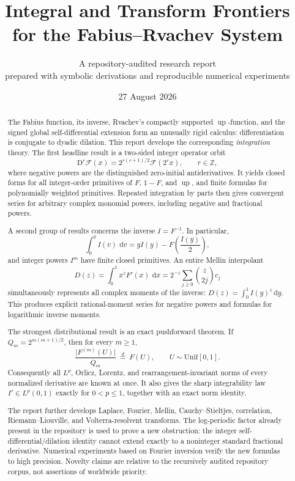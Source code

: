 \documentclass[11pt]{article}
\title{\bfseries Integral and Transform Frontiers\\[2mm]
for the Fabius--Rvachev System}
\author{A repository-audited research report\\
\small prepared with symbolic derivations and reproducible numerical experiments}
\date{27 August 2026}
\theoremstyle{definition}
\theoremstyle{remark}
\DeclareMathOperator{\upf}{up}
\newcommand{\dd}{\,\mathrm d}
\newcommand{\FF}{\mathscr F}
\newcommand{\abs}[1]{\lvert#1\rvert}
\begin{document}
\maketitle

\begin{abstract}
The Fabius function, its inverse, Rvachev's compactly supported \(\upf\)-function,
and the signed global self-differential extension form an unusually rigid calculus:
differentiation is conjugate to dyadic dilation.  This report develops the corresponding
\emph{integration} theory.  The first headline result is a two-sided integer
operator orbit
\[
  \mathrm D^r\FF(x)=2^{r(r+1)/2}\FF(2^r x),\qquad r\in\mathbb Z,
\]
where negative powers are the distinguished zero-initial antiderivatives.  It yields
closed forms for all integer-order primitives of \(F\), \(1-F\), and \(\upf\), and
finite formulas for polynomially weighted primitives.  Repeated integration by parts
then gives convergent series for arbitrary complex monomial powers, including negative
and fractional powers.

A second group of results concerns the inverse \(I=F^{-1}\).  In particular,
\[
  \int_0^y I(v)\,\dd v
  =yI(y)-F\!\left(\frac{I(y)}2\right),
\]
and integer powers \(I^m\) have finite closed primitives.  An entire Mellin
interpolant
\[
  D(z)=\int_0^1 x^zF'(x)\,\dd x
      =2^{-z}\sum_{j\ge0}\binom z{2j}c_j
\]
simultaneously represents all complex moments of the inverse:
\(D(z)=\int_0^1I(y)^z\dd y\).  This produces explicit rational-moment series for
negative powers and formulas for logarithmic inverse moments.

The strongest distributional result is an exact pushforward theorem.  If
\(Q_m=2^{m(m+1)/2}\), then for every \(m\ge1\),
\[
  \frac{\abs{F^{(m)}(U)}}{Q_m}\ \stackrel{d}{=}\ F(U),\qquad U\sim\mathrm{Unif}[0,1].
\]
Consequently all \(L^p\), Orlicz, Lorentz, and rearrangement-invariant norms of every
normalized derivative are known at once.  It also gives the sharp integrability law
\(I'\in L^p(0,1)\) exactly for \(0<p\le1\), together with an exact norm identity.

The report further develops Laplace, Fourier, Mellin, Cauchy--Stieltjes, correlation,
Riemann--Liouville, and Volterra-resolvent transforms.  The log-periodic factor already
present in the repository is used to prove a new obstruction: the integer
self-differential/dilation identity cannot extend exactly to a noninteger standard
fractional derivative.  Numerical experiments based on Fourier inversion verify the
new formulas to high precision.  Novelty claims are relative to the recursively audited
repository corpus, not assertions of worldwide priority.
\end{abstract}
\end{document}

